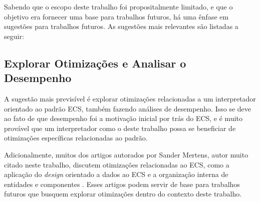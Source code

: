 




Sabendo que o escopo deste trabalho foi propositalmente limitado, e que o objetivo era fornecer uma base para trabalhos futuros, há uma ênfase em sugestões para trabalhos futuros. As sugestões mais relevantes são listadas a seguir:

\subsection{Explorar Otimizações e Analisar o Desempenho}

A sugestão mais previsível é explorar otimizações relacionadas a um interpretador orientado ao padrão ECS, também fazendo análises de desempenho. Isso se deve ao fato de que desempenho foi a motivação inicial por trás do ECS, e é muito provável que um interpretador como o deste trabalho possa se beneficiar de otimizações específicas relacionadas ao padrão.

Adicionalmente, muitos dos artigos autorados por Sander Mertens, autor muito citado neste trabalho, discutem otimizações relacionadas ao ECS, como a aplicação do \textit{design} orientado a dados ao ECS e a organização interna de entidades e componentes \cite{ecsfaq, ecsstorageinpics}. Esses artigos podem servir de base para trabalhos futuros que busquem explorar otimizações dentro do contexto deste trabalho.

